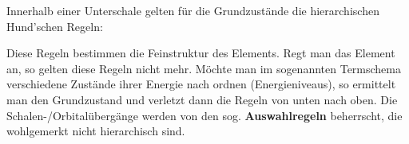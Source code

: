 \documentclass[Ex4_Zusammenfassung.tex]{subfiles}
\begin{document}
Innerhalb einer Unterschale gelten für die Grundzustände die hierarchischen Hund'schen Regeln:

Diese Regeln bestimmen die Feinstruktur des Elements. Regt man das Element an, so gelten diese Regeln nicht mehr. Möchte man im sogenannten Termschema verschiedene Zustände ihrer Energie nach ordnen (Energieniveaus), so ermittelt man den Grundzustand und verletzt dann die Regeln von unten nach oben.
Die  Schalen-/Orbitalübergänge werden von den sog. \textbf{Auswahlregeln} beherrscht, die wohlgemerkt nicht hierarchisch sind.
\end{document}
